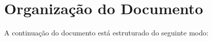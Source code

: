 % 
\bigskip 






\section{Organização do Documento}
\label{sec:intro_document_outline}


A continuação do documento está estruturado do seguinte modo:

